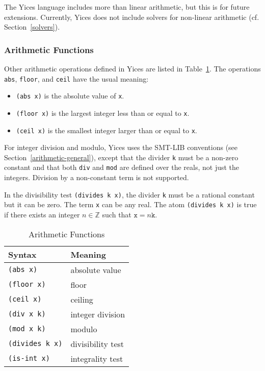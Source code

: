 \documentclass[11pt,twoside,fleqn,openright,titlepage]{cslreport}
\newcommand{\integers}{\ensuremath{\mathbb{Z}}}
\begin{document}
\medskip\noindent
The Yices language includes more than linear arithmetic, but this is
for future extensions. Currently, Yices does not include solvers for
non-linear arithmetic (cf. Section~\ref{solvers}).

\subsubsection*{Arithmetic Functions}

Other arithmetic operations defined in Yices are listed in Table~\ref{Arithmetic-Functions}.
The operations \texttt{abs}, \texttt{floor}, and \texttt{ceil} have the usual meaning:
\begin{itemize}
\item \texttt{(abs x)} is the absolute value of \texttt{x}.
\item \texttt{(floor x)} is the largest integer less than or equal to \texttt{x}.
\item \texttt{(ceil x)} is the smallest integer larger than or equal to \texttt{x}.
\end{itemize}
For integer division and modulo, Yices uses the SMT-LIB conventions (see
Section~\ref{arithmetic-general}), except that the divider \texttt{k}
must be a non-zero constant and that both \texttt{div} and
\texttt{mod} are defined over the reals, not just the integers.
Division by a non-constant term is not supported.

\medskip\noindent In the divisibility test \texttt{(divides k x)}, the
divider \texttt{k} must be a rational constant but it can be zero. The
term \texttt{x} can be any real. The atom \texttt{(divides k x)} is
true if there exists an integer $n\in\integers$ such that $\mathtt{x} = n
\mathtt{k}$.

\begin{table}[h]
\begin{small}
\begin{center}
\begin{tabular}{|p{3.4cm}|l|}
\hline Syntax & Meaning \\
\hline
\texttt{(abs x)} & absolute value \\
\texttt{(floor x)} & floor \\
\texttt{(ceil x)} & ceiling \\
\hline
\texttt{(div x k)} & integer division \\
\texttt{(mod x k)} & modulo \\
\texttt{(divides k x)} & divisibility test\\
\texttt{(is-int x)} & integrality test\\
\hline
\end{tabular}
\end{center}
\end{small}
\caption{Arithmetic Functions}
\label{Arithmetic-Functions}
\end{table}
\end{document}

